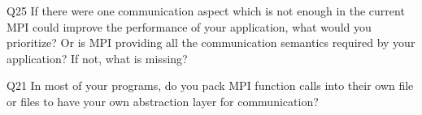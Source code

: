 \begin{description}%
\item{Q25} If there were one communication aspect which is not enough in the current MPI could improve the performance of your application, what would you prioritize? Or is MPI providing all the communication semantics required by your application? If not, what is missing?%
\item{Q21} In most of your programs, do you pack MPI function calls into their own file or files to have your own abstraction layer for communication?%
\end{description}%
